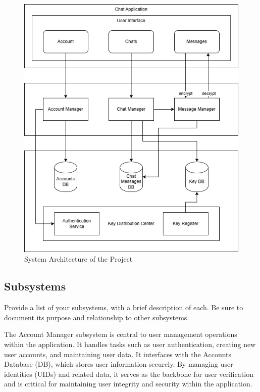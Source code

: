 \documentclass[]{article}
\begin{document}
\begin{figure}[H]
	\centering
	\includegraphics[width=1\textwidth]{architecture_diagram.drawio.png}
	\caption{System Architecture of the Project}
\end{figure}


\subsection{Subsystems}
\label{sub:subsystems}
 Provide a list of your subsystems, with a brief description of each. Be sure to document its purpose and relationship to other subsystems.

    The Account Manager subsystem is central to user management operations within the application. It handles tasks such as user authentication, creating new user accounts, and maintaining user data. It interfaces with the Accounts Database (DB), which stores user information securely. By managing user identities (UIDs) and related data, it serves as the backbone for user verification and is critical for maintaining user integrity and security within the application.
\end{document}
